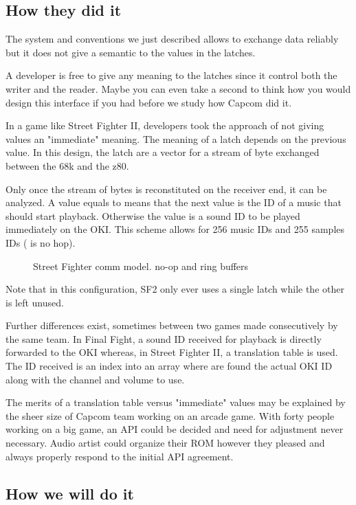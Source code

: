 \subsection{How they did it}
The system and conventions we just described allows to exchange data reliably but it does not give a semantic to the values in the latches. 

A developer is free to give any meaning to the latches since it control both the writer and the reader. Maybe you can even take a second to think how you would design this interface if you had before we study how Capcom did it.

In a game like Street Fighter II, developers took the approach of not giving values an "immediate" meaning. The meaning of a latch depends on the previous value. In this design, the latch are a vector for a stream of byte exchanged between the 68k and the z80.




Only once the stream of bytes is reconstituted on the receiver end, it can be analyzed. A value equals to  means that the next value is the ID of a music that should start playback. Otherwise the value is a sound ID to be played immediately on the OKI. This scheme allows for 256 music IDs and 255 samples IDs ( is no hop).

 \begin{figure}[H]
\caption*{Street Fighter comm model.  no-op and ring buffers}
\end{figure}

Note that in this configuration, SF2 only ever uses a single latch while the other is left unused.

Further differences exist, sometimes between two games made consecutively by the same team. In Final Fight, a sound ID received for playback is directly forwarded to the OKI whereas, in Street Fighter II, a translation table is used. The ID received is an index into an array where are found the actual OKI ID along with the channel and volume to use.

The merits of a translation table versus "immediate" values may be explained by the sheer size of Capcom team working on an arcade game. With forty people working on a big game, an API could be decided and need for adjustment never necessary. Audio artist could organize their ROM however they pleased and always properly respond to the initial API agreement.


\subsection{How we will do it}

